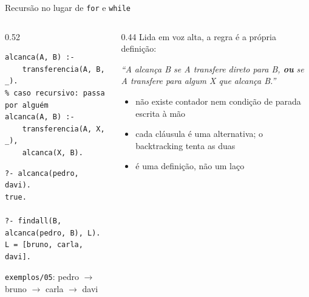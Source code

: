 \documentclass[aspectratio=169,11pt,xcolor=table]{beamer}
\begin{document}
\begin{frame}[fragile]{Recursão no lugar de \texttt{for} e \texttt{while}}
  \begin{columns}[T]
    \begin{column}{0.52\textwidth}
\begin{lstlisting}[style=pl]
% caso base: transferência direta
alcanca(A, B) :-
    transferencia(A, B, _).
% caso recursivo: passa por alguém
alcanca(A, B) :-
    transferencia(A, X, _),
    alcanca(X, B).
\end{lstlisting}
      \vspace{4pt}
\begin{lstlisting}[style=pl]
?- alcanca(pedro, davi).
true.

?- findall(B, alcanca(pedro, B), L).
L = [bruno, carla, davi].
\end{lstlisting}
      {\scriptsize\color{muted} \texttt{exemplos/05}: pedro $\to$ bruno $\to$ carla $\to$ davi}
    \end{column}
    \begin{column}{0.44\textwidth}
      \small
      Lida em voz alta, a regra é a própria definição:
      \vspace{4pt}

      \emph{``A alcança B se A transfere direto para B, \textbf{ou} se A
      transfere para algum X que alcança B.''}
      \vspace{10pt}

      \begin{itemize}
        \item não existe contador nem condição de parada escrita à mão
        \item cada cláusula é uma alternativa; o backtracking tenta as duas
        \item é uma \alert{definição}, não um laço
      \end{itemize}
    \end{column}
  \end{columns}
\end{frame}
\end{document}
